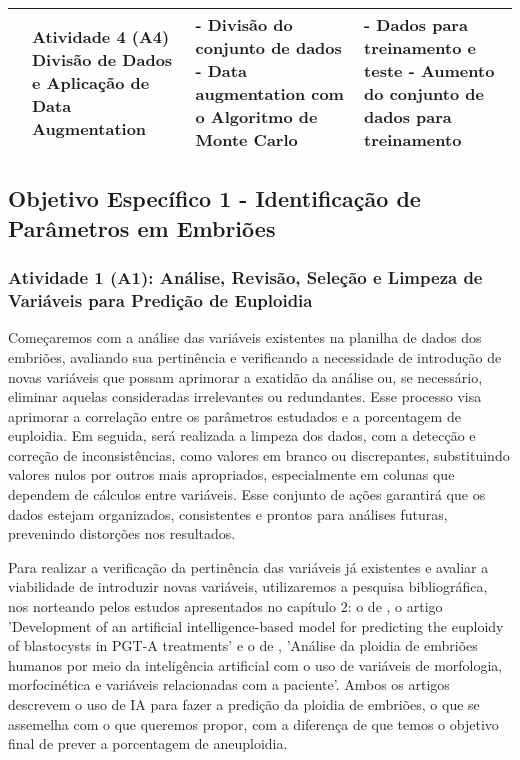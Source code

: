 \begin{table}[h!]
{\begin{tabular}{|p{3cm}|p{4cm}|p{3cm}|p{5cm}|}
      & 
      \textcolor[HTML]{133E78}{\textbf{Atividade 4 (A4)}} \newline
      Divisão de Dados e Aplicação de Data Augmentation & 
      - Divisão do conjunto de dados \newline
      - Data augmentation com o Algoritmo de Monte Carlo &
      - Dados para treinamento e teste \newline
      - Aumento do conjunto de dados para treinamento \\
      \hline
    \end{tabular}
  }
\end{table}
\FloatBarrier 

\subsection{\textbf{Objetivo Específico 1} - Identificação de Parâmetros em Embriões}

\subsubsection{\textbf{Atividade 1 (A1):} Análise, Revisão, Seleção e Limpeza de Variáveis para Predição de Euploidia}

Começaremos com a análise das variáveis existentes na planilha de dados dos embriões, avaliando sua pertinência e verificando a necessidade de introdução de novas variáveis que possam aprimorar a exatidão da análise ou, se necessário, eliminar aquelas consideradas irrelevantes ou redundantes. Esse processo visa aprimorar a correlação entre os parâmetros estudados e a porcentagem de euploidia. Em seguida, será realizada a limpeza dos dados, com a detecção e correção de inconsistências, como valores em branco ou discrepantes, substituindo valores nulos por outros mais apropriados, especialmente em colunas que dependem de cálculos entre variáveis. Esse conjunto de ações garantirá que os dados estejam organizados, consistentes e prontos para análises futuras, prevenindo distorções nos resultados.

Para realizar a verificação da pertinência das variáveis já existentes e avaliar a viabilidade de introduzir novas variáveis, utilizaremos a pesquisa bibliográfica, nos norteando pelos estudos apresentados no capítulo 2: o de , o artigo 'Development of an artificial intelligence-based model for predicting the euploidy of blastocysts in PGT-A treatments' e o de , 'Análise da ploidia de embriões humanos por meio da inteligência artificial com o uso de variáveis de morfologia, morfocinética e variáveis relacionadas com a paciente'. Ambos os artigos descrevem o uso de IA para fazer a predição da ploidia de embriões, o que se assemelha com o que queremos propor, com a diferença de que temos o objetivo final de prever a porcentagem de aneuploidia. 


